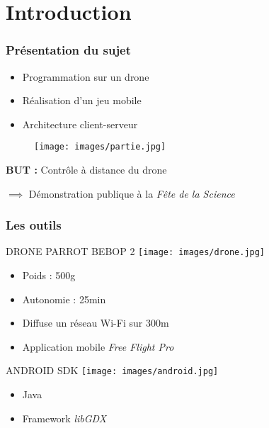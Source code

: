 \section{Introduction}
\begin{frame}
\frametitle{Présentation du sujet}
\begin{center}
\begin{itemize}
\item Programmation sur un drone
\item Réalisation d'un jeu mobile
\item Architecture client-serveur
\end{itemize}
\begin{figure}
\texttt{[image: images/partie.jpg]}
\end{figure}
\end{center}

\textbf{BUT :} Contrôle à distance du drone

$\implies$ Démonstration publique à la \textit{Fête de la Science}
\end{frame}

\begin{frame}
\frametitle{Les outils}
\begin{minipage}[t]{.46\linewidth}
      \begin{center}
      DRONE PARROT BEBOP 2
      \texttt{[image: images/drone.jpg]}
      \begin{itemize}
      \item Poids : 500g
      \item Autonomie : 25min
      \item Diffuse un réseau Wi-Fi sur 300m
      \item Application mobile \textit{Free Flight Pro}
      \end{itemize}
      \end{center}
   \end{minipage} \hfill
   \begin{minipage}[t]{.46\linewidth}
      \begin{center}
      ANDROID SDK
      \texttt{[image: images/android.jpg]}
      \begin{itemize}
      \item Java
      \item Framework \textit{libGDX}
      \end{itemize}
      \end{center}
   \end{minipage}
\end{frame}